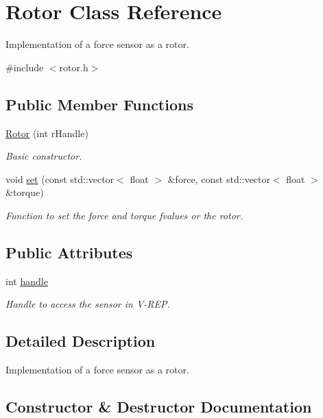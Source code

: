 \hypertarget{classRotor}{}\section{Rotor Class Reference}
\label{classRotor}


Implementation of a force sensor as a rotor.  




{\ttfamily \#include $<$rotor.\+h$>$}

\subsection*{Public Member Functions}
\begin{DoxyCompactItemize}
\item 
\hyperlink{classRotor_ab1ad46cf401db508602fb136f09094c2}{Rotor} (int r\+Handle)
\begin{DoxyCompactList}\small\item\em Basic constructor. \end{DoxyCompactList}\item 
void \hyperlink{classRotor_aa961955180593d6249b3c35730b29cfb}{set} (const std\+::vector$<$ float $>$ \&force, const std\+::vector$<$ float $>$ \&torque)
\begin{DoxyCompactList}\small\item\em Function to set the force and torque fvalues or the rotor. \end{DoxyCompactList}\end{DoxyCompactItemize}
\subsection*{Public Attributes}
\begin{DoxyCompactItemize}
\item 
int \hyperlink{classRotor_ae6da9102b10f4759201a62117f6b2b6e}{handle}
\begin{DoxyCompactList}\small\item\em Handle to access the sensor in V-\/\+R\+EP. \end{DoxyCompactList}\end{DoxyCompactItemize}


\subsection{Detailed Description}
Implementation of a force sensor as a rotor. 

\subsection{Constructor \& Destructor Documentation}
